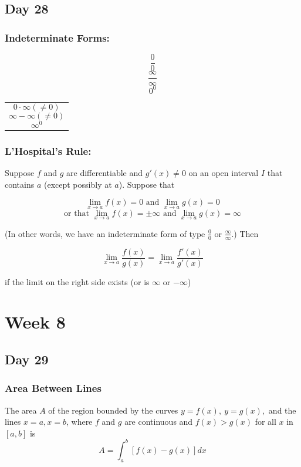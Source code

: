 \documentclass[12pt]{article}
\begin{document}
\subsection{Day 28}
\subsubsection{Indeterminate Forms:}

\begin{minipage}{0.45\textwidth}

$$ \frac{0}{0}$$
$$ \frac{\infty}{\infty}$$
$$ 0^0$$\hfill
\end{minipage}
\begin{minipage}{0.45\textwidth}

\begin{tabular}{|p{\textwidth}}

$$0 \cdot \infty (\neq{} 0)$$
$$\infty - \infty (\neq{} 0)$$
$$\infty^0$$

\end{tabular}
\end{minipage}

\subsubsection{L'Hospital's Rule:} Suppose $f$ and $g$ are differentiable and $g'(x) \neq{} 0$ on an open interval $I$ that contains $a$ (except possibly at $a$). Suppose that 

$$\lim_{x\to a} f(x)  = 0  \text{ and  } \lim_{x \to a} g(x) = 0$$
$$\text{or that } \lim_{x\to a} f(x)  = \pm \infty  \text{ and  } \lim_{x \to a} g(x) = \infty$$

\noindent (In other words, we have an indeterminate form of type $\frac{0}{0}$ or $\frac{\infty}{\infty}$.) Then

$$\lim_{x\to a} \frac{f(x)}{g(x)} = \lim_{x\to a} \frac{f'(x)}{g'(x)}$$

\noindent if the limit on the right side exists (or is $\infty$ or $-\infty$)



\section{Week 8}
\subsection{Day 29}
\subsubsection{Area Between Lines} The area $A$ of the region bounded by the curves $y=f(x),\ y = g(x),$ and the lines $x=a, x=b$, where $f$ and $g$ are continuous and $f(x)>g(x)$ for  all $x$ in $[a,b]$ is 
$$A = \int_a^b \left[ f(x) - g(x) \right] dx$$
\end{document}
